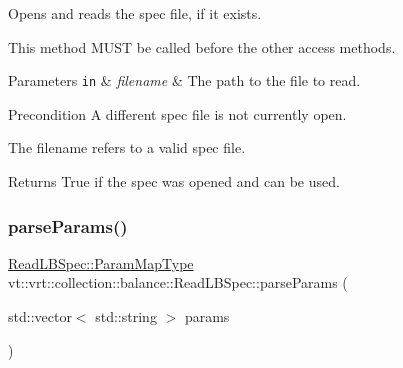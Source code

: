 Opens and reads the spec file, if it exists. 

This method M\+U\+ST be called before the other access methods.


\begin{DoxyParams}[1]{Parameters}
\mbox{\tt in}  & {\em filename} & The path to the file to read.\\
\hline
\end{DoxyParams}
\begin{DoxyPrecond}{Precondition}
A different spec file is not currently open. 

The filename refers to a valid spec file.
\end{DoxyPrecond}
\begin{DoxyReturn}{Returns}
True if the spec was opened and can be used. 
\end{DoxyReturn}
\mbox{\label{structvt_1_1vrt_1_1collection_1_1balance_1_1_read_l_b_spec_a69993cae4576e25d70929e95dad81d7e}} 
\subsubsection{\texorpdfstring{parse\+Params()}{parseParams()}}
{\footnotesize\ttfamily \hyperlink{structvt_1_1vrt_1_1collection_1_1balance_1_1_read_l_b_spec_a05e30b32f0ca5df2cb160514fa0eeb41}{Read\+L\+B\+Spec\+::\+Param\+Map\+Type} vt\+::vrt\+::collection\+::balance\+::\+Read\+L\+B\+Spec\+::parse\+Params (\begin{DoxyParamCaption}\item[{std\+::vector$<$ std\+::string $>$}]{params }\end{DoxyParamCaption})\hspace{0.3cm}{\ttfamily [static]}}

\mbox{\label{structvt_1_1vrt_1_1collection_1_1balance_1_1_read_l_b_spec_a3e3d82556062c51ce3977727884400a4}} 
